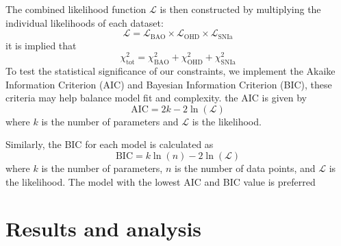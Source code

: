 \documentclass[a4paper,fleqn]{cas-sc}
\begin{document}
The combined likelihood function $\mathcal{L}$ is then constructed by multiplying the individual likelihoods of each dataset:
\begin{equation}
\mathcal{L} = \mathcal{L}_{\text{BAO}} \times \mathcal{L}_{\text{OHD}} \times \mathcal{L}_{\text{SNIa}}
\end{equation}
it is implied that
\begin{equation}
    \chi^2_\text{tot}=\chi^2_{\text{BAO}}+\chi^2_{\text{OHD}} +\chi^2_{\text{SNIa}}
\end{equation}
To test the statistical significance of our constraints, we implement the Akaike Information Criterion (AIC) and Bayesian Information Criterion (BIC), these criteria may help balance model fit and complexity. 
the AIC is given by
\begin{equation}
\text{AIC} = 2k - 2 \ln(\mathcal{L})
\end{equation}
where $k$ is the number of parameters and $\mathcal{L}$ is the likelihood. 

Similarly, the BIC for each model is calculated as
\begin{equation}
\text{BIC} = k \ln(n) - 2 \ln(\mathcal{L})
\end{equation}
where $k$ is the number of parameters, $n$ is the number of data points, and $\mathcal{L}$ is the likelihood. The model with the lowest AIC and BIC value is preferred




\section{Results and analysis}\label{sec:result}
\end{document}
